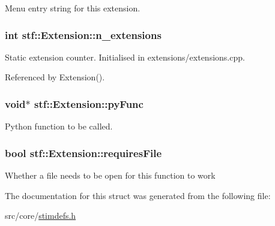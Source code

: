 Menu entry string for this extension. \hypertarget{structstf_1_1Extension_a143b2d64266f86fe54937c98fdb59c32}{
\subsubsection[{n\_\-extensions}]{\setlength{\rightskip}{0pt plus 5cm}int {\bf stf::Extension::n\_\-extensions}}}
\label{structstf_1_1Extension_a143b2d64266f86fe54937c98fdb59c32}
Static extension counter. Initialised in extensions/extensions.cpp. 

Referenced by Extension().

\hypertarget{structstf_1_1Extension_a2c2aeac701f3925233924aff9d1466b8}{
\subsubsection[{pyFunc}]{\setlength{\rightskip}{0pt plus 5cm}void$\ast$ {\bf stf::Extension::pyFunc}}}
\label{structstf_1_1Extension_a2c2aeac701f3925233924aff9d1466b8}
Python function to be called. \hypertarget{structstf_1_1Extension_abaef4f6bdc9af533d706344c40ae4cf4}{
\subsubsection[{requiresFile}]{\setlength{\rightskip}{0pt plus 5cm}bool {\bf stf::Extension::requiresFile}}}
\label{structstf_1_1Extension_abaef4f6bdc9af533d706344c40ae4cf4}
Whether a file needs to be open for this function to work 

The documentation for this struct was generated from the following file:\begin{DoxyCompactItemize}
\item 
src/core/\hyperlink{stimdefs_8h}{stimdefs.h}\end{DoxyCompactItemize}
